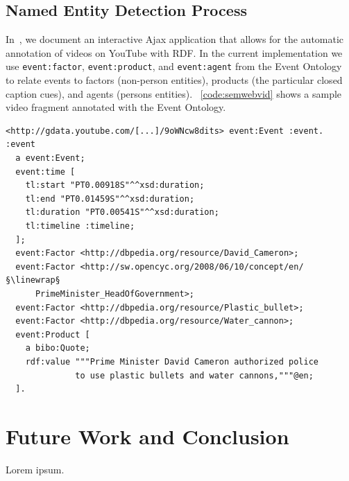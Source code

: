 \documentclass[runningheads,a4paper]{llncs}
\newcommand{\linewrap}{\raisebox{-.4ex}{\textcolor{grey}{$\rhookleftarrow$}}}
\begin{document}
\subsection{Named Entity Detection Process}
In~\cite{semwebvid}, we document an interactive Ajax application that allows for the automatic annotation of videos on YouTube with RDF. In the current implementation we use \texttt{event:factor}, \texttt{event:product}, and \texttt{event:agent} from the Event Ontology~\cite{Raimond:Event} to relate events to factors (non-person entities), products (the particular closed caption cues), and agents (persons entities). ~\ref{code:semwebvid} shows a sample video fragment annotated with the Event Ontology.

\begin{lstlisting}[caption=Exemplary extracted named entities from a YouTube video on the London riots., label=code:semwebvid, float=t, escapechar=§]
<http://gdata.youtube.com/[...]/9oWNcw8dits> event:Event :event.
:event
  a event:Event;
  event:time [
    tl:start "PT0.00918S"^^xsd:duration;
    tl:end "PT0.01459S"^^xsd:duration;
    tl:duration "PT0.00541S"^^xsd:duration;
    tl:timeline :timeline;
  ];
  event:Factor <http://dbpedia.org/resource/David_Cameron>;
  event:Factor <http://sw.opencyc.org/2008/06/10/concept/en/§\linewrap§
      PrimeMinister_HeadOfGovernment>;
  event:Factor <http://dbpedia.org/resource/Plastic_bullet>;
  event:Factor <http://dbpedia.org/resource/Water_cannon>;
  event:Product [
    a bibo:Quote;
    rdf:value """Prime Minister David Cameron authorized police
              to use plastic bullets and water cannons,"""@en;
  ].
\end{lstlisting} 

\section{Future Work and Conclusion} \label{sec:future-work-conclusion}
Lorem ipsum.

\renewcommand{\ttdefault}{cmvtt}
\renewcommand\UrlFont\tt



\end{document}
